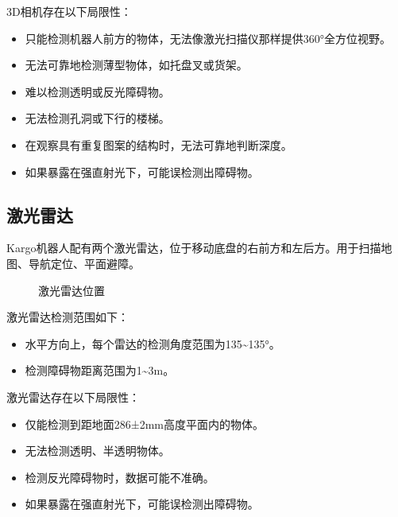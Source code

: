 \documentclass[a4paper,11pt,english,openany,oneside]{sphinxmanual}
\begin{document}
\sphinxAtStartPar
3D相机存在以下局限性：
\begin{itemize}
\item {} 
\sphinxAtStartPar
只能检测机器人前方的物体，无法像激光扫描仪那样提供360°全方位视野。

\item {} 
\sphinxAtStartPar
无法可靠地检测薄型物体，如托盘叉或货架。

\item {} 
\sphinxAtStartPar
难以检测透明或反光障碍物。

\item {} 
\sphinxAtStartPar
无法检测孔洞或下行的楼梯。

\item {} 
\sphinxAtStartPar
在观察具有重复图案的结构时，无法可靠地判断深度。

\item {} 
\sphinxAtStartPar
如果暴露在强直射光下，可能误检测出障碍物。

\end{itemize}


\subsection{激光雷达}
\label{\detokenize{07 _u6280_u672f_u89c4_u683c:id35}}\label{\detokenize{07 _u6280_u672f_u89c4_u683c:id36}}
\sphinxAtStartPar
Kargo机器人配有两个激光雷达，位于移动底盘的右前方和左后方。用于扫描地图、导航定位、平面避障。

\begin{figure}[H]
\centering
\capstart

\noindent{}
\caption{激光雷达位置}\label{\detokenize{07 _u6280_u672f_u89c4_u683c:id75}}\end{figure}



\sphinxAtStartPar
激光雷达检测范围如下：
\begin{itemize}
\item {} 
\sphinxAtStartPar
水平方向上，每个雷达的检测角度范围为\sphinxhyphen{}135\textasciitilde{}135°。

\item {} 
\sphinxAtStartPar
检测障碍物距离范围为1\textasciitilde{}3m。

\end{itemize}

\sphinxAtStartPar
激光雷达存在以下局限性：
\begin{itemize}
\item {} 
\sphinxAtStartPar
仅能检测到距地面286±2mm高度平面内的物体。

\item {} 
\sphinxAtStartPar
无法检测透明、半透明物体。

\item {} 
\sphinxAtStartPar
检测反光障碍物时，数据可能不准确。

\item {} 
\sphinxAtStartPar
如果暴露在强直射光下，可能误检测出障碍物。

\end{itemize}
\end{document}
